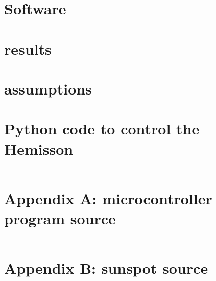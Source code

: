 \documentclass[a4paper, 12pt, titlepage]{article}
\begin{document}
\section{Software}


\section{results} %

\section{assumptions} %


\newpage
\appendix

\section{Python code to control the Hemisson} %
\label{python_code_1_appendix}
\begin{verbatim}

\end{verbatim}


\section{Appendix A: microcontroller program source} %

\begin{verbatim}

\end{verbatim}


\section{Appendix B: sunspot source} %

\end{document}
